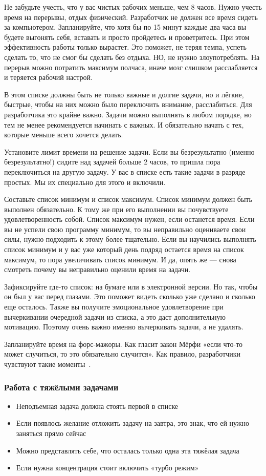\documentclass{../industrial-development}
\begin{document}
Не забудьте учесть, что у вас чистых рабочих меньше, чем 8 часов. Нужно учесть время на перерывы, отдых физический. Разработчик не должен все время сидеть за компьютером. Запланируйте, что хотя бы по 15 минут каждые два часа вы будете выгонять себя, вставать и просто пройдетесь и проветритесь. При этом эффективность работы только вырастет. Это поможет, не теряя темпа, успеть сделать то, что не смог бы сделать без отдыха.
НО, не нужно злоупотреблять. На перерыв можно потратить максимум полчаса, иначе мозг слишком расслабляется и теряется рабочий настрой.

В этом списке должны быть не только важные и долгие задачи, но и лёгкие, быстрые, чтобы на них можно было переключить внимание, расслабиться. Для разработчика это крайне важно. Задачи можно выполнять в любом порядке, но тем не менее рекомендуется начинать с важных. И обязательно начать с тех, которые меньше всего хочется делать.

Установите лимит времени на решение задачи. Если вы безрезультатно (именно безрезультатно!) сидите над задачей больше 2 часов, то пришла пора переключиться на другую задачу. У вас в списке есть такие задачи в разряде простых. Мы их специально для этого и включили.

Составьте список минимум и список максимум. Список минимум должен быть выполнен обязательно. К тому же при его выполнении вы почувствуете удовлетворенность собой. Список максимум нужен, если останется время. Если вы не успели свою программу минимум, то вы неправильно оцениваете свои силы, нужно подходить к этому более тщательно.
Если вы научились выполнять список минимум и у вас уже который день подряд остается время на список максимум, то пора увеличивать список минимум. И да, опять же — снова смотреть почему вы неправильно оценили время на задачи.

Зафиксируйте где-то список: на бумаге или в электронной версии. Но так, чтобы он был у вас перед глазами. Это поможет видеть сколько уже сделано и сколько еще осталось. Также вы получите эмоциональное удовлетворение при вычеркивании очередной задачи из списка, а это даст дополнительную мотивацию. Поэтому очень важно именно вычеркивать задачи, а не удалять.

Запланируйте время на форс-мажоры. Как гласит закон Мёрфи «если что-то может случиться, то это обязательно случится». Как правило, разработчики чувствуют такие моменты~\cite{TMHabr}.

\begin{frame} \frametitle{Работа с тяжёлыми задачами}
  \begin{itemize}
  \item Неподъемная задача должна стоять первой в списке
  \item Если появлось желание отложить задачу на завтра, это знак, что ей нужно заняться прямо сейчас
  \item Можно представлять себе, что осталась только одна эта тяжёлая задача
  \item Если нужна концентрация стоит включить «турбо режим»
  \end{itemize}
\end{frame}
\end{document}
